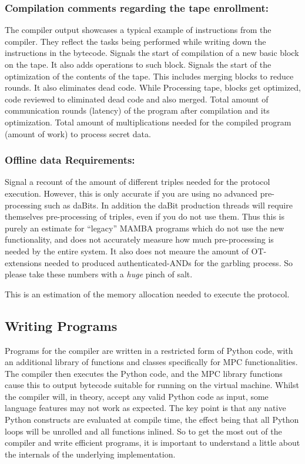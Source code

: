 \subsubsection{Compilation comments regarding the tape enrollment:} 
The compiler output showcases a typical example of instructions from the compiler. They reflect the tasks being performed while writing down the instructions in the bytecode.
Signals the start of compilation of a new basic block on the tape. It also adds operations to such block.
Signals the start of the optimization of the contents of the tape. This includes merging blocks to reduce rounds. It also eliminates dead code.
While Processing tape, blocks get optimized, code reviewed to eliminated dead code and also merged.
Total amount of communication rounds (latency) of the program after compilation and its optimization.
Total amount of multiplications needed for the compiled program (amount of work) to process secret data.

\subsubsection{Offline data Requirements:} 

Signal a recount of the amount of different triples needed for the protocol execution. 
However, this is only accurate if you are using no advanced pre-processing such
as daBits. In addition the daBit production threads will require themselves
pre-processing of triples, even if you do not use them. Thus this is purely an estimate
for ``legacy'' MAMBA programs which do not use the new functionality, and
does not accurately measure how much pre-processing is needed by the 
entire system.
It also does not meaure the amount of OT-extensions needed to produced
authenticated-ANDs for the garbling process.
So please take these numbers with a {\em huge} pinch of salt.

This is an estimation of the memory allocation needed to execute the protocol.

\subsection{Writing Programs}

Programs for the compiler are written in a restricted form of Python code,
with an additional library of functions and classes specifically for MPC
functionalities. The compiler then executes the Python code, and the MPC
library functions cause this to output
bytecode suitable for running on the virtual machine.
Whilst the compiler will, in theory, accept any valid Python
code as input, some language features may not work as expected.
The key point is that any native Python constructs are evaluated at compile
time, the effect being that all Python loops will be unrolled and all functions
inlined.
So to get the most out of the compiler and write efficient programs,
it is important to understand a little about the internals of the underlying implementation.

